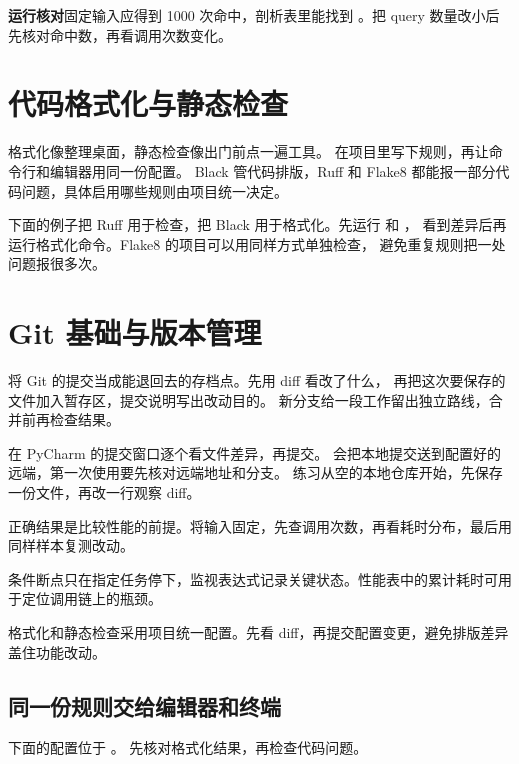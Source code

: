 \textbf{运行核对}\enspace 固定输入应得到 1000 次命中，剖析表里能找到 。把 query 数量改小后先核对命中数，再看调用次数变化。

\section{代码格式化与静态检查}

格式化像整理桌面，静态检查像出门前点一遍工具。
在项目里写下规则，再让命令行和编辑器用同一份配置。
Black 管代码排版，Ruff 和 Flake8 都能报一部分代码问题，具体启用哪些规则由项目统一决定。

下面的例子把 Ruff 用于检查，把 Black 用于格式化。先运行
 和 ，
看到差异后再运行格式化命令。Flake8 的项目可以用同样方式单独检查，
避免重复规则把一处问题报很多次。


\section{Git 基础与版本管理}

将 Git 的提交当成能退回去的存档点。先用 diff 看改了什么，
再把这次要保存的文件加入暂存区，提交说明写出改动目的。
新分支给一段工作留出独立路线，合并前再检查结果。

在 PyCharm 的提交窗口逐个看文件差异，再提交。
 会把本地提交送到配置好的远端，第一次使用要先核对远端地址和分支。
练习从空的本地仓库开始，先保存一份文件，再改一行观察 diff。

\begin{myunderstanding}
正确结果是比较性能的前提。将输入固定，先查调用次数，再看耗时分布，最后用同样样本复测改动。
\end{myunderstanding}

\begin{pycharmpractice}
条件断点只在指定任务停下，监视表达式记录关键状态。性能表中的累计耗时可用于定位调用链上的瓶颈。
\end{pycharmpractice}

\begin{pitfall}
格式化和静态检查采用项目统一配置。先看 diff，再提交配置变更，避免排版差异盖住功能改动。
\end{pitfall}

\subsection*{同一份规则交给编辑器和终端}
下面的配置位于 。
先核对格式化结果，再检查代码问题。
\par\noindent{}\par
\noindent{}\par

